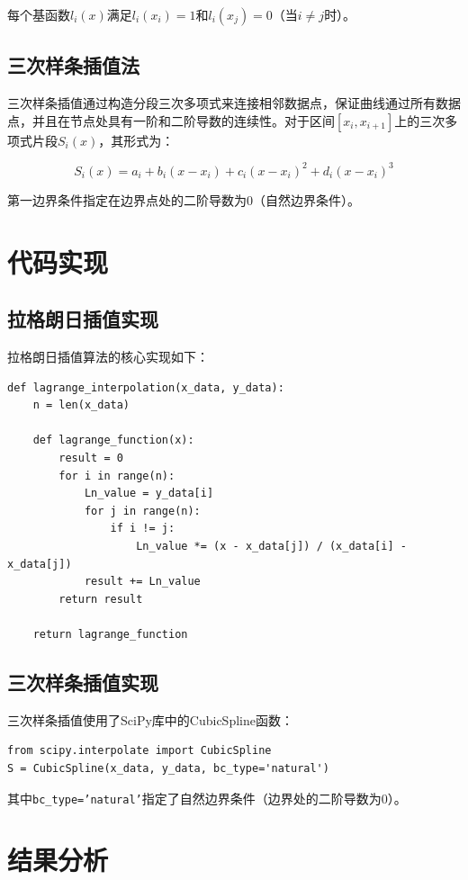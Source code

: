 \documentclass{article}
\begin{document}
每个基函数$l_i(x)$满足$l_i(x_i)=1$和$l_i(x_j)=0$（当$i\neq j$时）。

\subsection{三次样条插值法}
三次样条插值通过构造分段三次多项式来连接相邻数据点，保证曲线通过所有数据点，并且在节点处具有一阶和二阶导数的连续性。对于区间$[x_i,x_{i+1}]$上的三次多项式片段$S_i(x)$，其形式为：

\begin{equation}
S_i(x) = a_i + b_i(x-x_i) + c_i(x-x_i)^2 + d_i(x-x_i)^3
\end{equation}

第一边界条件指定在边界点处的二阶导数为0（自然边界条件）。

\section{代码实现}

\subsection{拉格朗日插值实现}
拉格朗日插值算法的核心实现如下：

\begin{verbatim}
def lagrange_interpolation(x_data, y_data):
    n = len(x_data)
    
    def lagrange_function(x):
        result = 0
        for i in range(n):
            Ln_value = y_data[i]
            for j in range(n):
                if i != j:
                    Ln_value *= (x - x_data[j]) / (x_data[i] - x_data[j])
            result += Ln_value
        return result
        
    return lagrange_function
\end{verbatim}

\subsection{三次样条插值实现}
三次样条插值使用了SciPy库中的CubicSpline函数：

\begin{verbatim}
from scipy.interpolate import CubicSpline
S = CubicSpline(x_data, y_data, bc_type='natural')
\end{verbatim}

其中\texttt{bc\_type='natural'}指定了自然边界条件（边界处的二阶导数为0）。

\section{结果分析}
\end{document}
